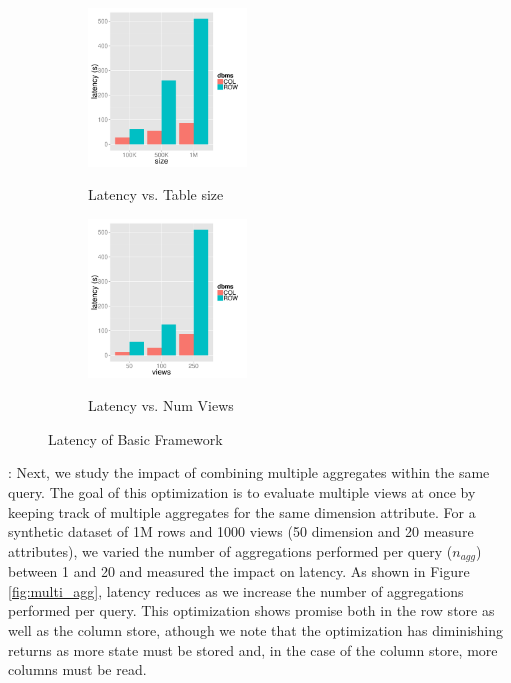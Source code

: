 \begin{figure}[h]
\centering
\begin{subfigure}{0.49\linewidth}
\centering
{\includegraphics[width=4.2cm] {Images/baselines_by_size.pdf}}
\caption{Latency vs. Table size}
\label{fig:baseline_size}
\end{subfigure}
\begin{subfigure}{0.49\linewidth}
\centering
{\includegraphics[width=4.2cm] {Images/baselines_by_views.pdf}}
\caption{Latency vs. Num Views}
\label{fig:baseline_views}
\end{subfigure}
\label{fig:baselines}
\caption{Latency of Basic Framework}
\end{figure}

: Next, we study the impact of
combining multiple aggregates within the same query.
The goal of this optimization is to evaluate multiple views at once by keeping
track of multiple aggregates for the same dimension attribute.
For a synthetic dataset of 1M rows and 1000 views (50 dimension and 20 measure
attributes), we varied the number of aggregations performed per query
($n_{agg}$) between 1 and 20 and measured the impact on latency.
As shown in Figure \ref{fig:multi_agg}, latency reduces as we increase the
number of aggregations performed per query.
This optimization shows promise both in the row store as well as the column
store, athough we note that the optimization has diminishing returns as more
state must be stored and, in the case of the column store, more columns must be
read. \\


